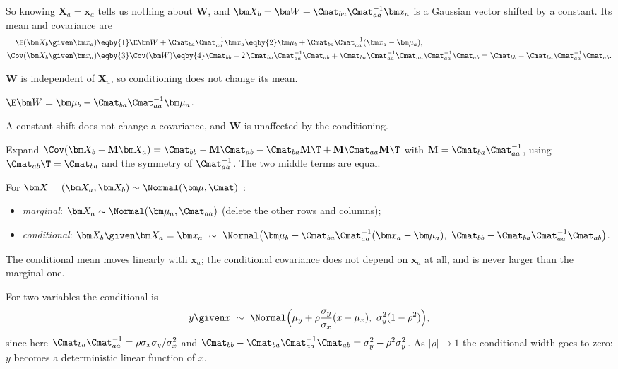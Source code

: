 So knowing $\bm X_a=\bm x_a$ tells us nothing about $\bm W$, and $\bm X_b=\bm W+\Cmat_{ba}\Cmat_{aa}^{-1}\bm x_a$ is a Gaussian vector shifted by a constant. Its mean and covariance are
\begin{align}
  \E(\bm X_b\given\bm x_a)
  &\eqby{1} \E\bm W+\Cmat_{ba}\Cmat_{aa}^{-1}\bm x_a
   \eqby{2} \bm\mu_b+\Cmat_{ba}\Cmat_{aa}^{-1}(\bm x_a-\bm\mu_a) ,\nonumber\\
  \Cov(\bm X_b\given\bm x_a)
  &\eqby{3} \Cov(\bm W)
   \eqby{4} \Cmat_{bb}-2\,\Cmat_{ba}\Cmat_{aa}^{-1}\Cmat_{ab}+\Cmat_{ba}\Cmat_{aa}^{-1}\Cmat_{aa}\Cmat_{aa}^{-1}\Cmat_{ab}
   = \Cmat_{bb}-\Cmat_{ba}\Cmat_{aa}^{-1}\Cmat_{ab} .
  \label{2b:eq:mvn-cond}
\end{align}
\begin{explain}
  \item $\bm W$ is independent of $\bm X_a$, so conditioning does not change its mean.
  \item $\E\bm W=\bm\mu_b-\Cmat_{ba}\Cmat_{aa}^{-1}\bm\mu_a$.
  \item A constant shift does not change a covariance, and $\bm W$ is unaffected by the conditioning.
  \item Expand $\Cov(\bm X_b-\mathbf M\bm X_a)=\Cmat_{bb}-\mathbf M\Cmat_{ab}-\Cmat_{ba}\mathbf M\T+\mathbf M\Cmat_{aa}\mathbf M\T$ with $\mathbf M=\Cmat_{ba}\Cmat_{aa}^{-1}$, using $\Cmat_{ab}\T=\Cmat_{ba}$ and the symmetry of $\Cmat_{aa}^{-1}$. The two middle terms are equal.
\end{explain}

\begin{keyidea}
For $\bm X=(\bm X_a,\bm X_b)\sim\Normal(\bm\mu,\Cmat)$ :
\begin{itemize}
  \item \emph{marginal}: $\bm X_a\sim\Normal(\bm\mu_a,\Cmat_{aa})$ (delete the other rows and columns);
  \item \emph{conditional}: $\bm X_b\given\bm X_a=\bm x_a\ \sim\ \Normal\bigl(\bm\mu_b+\Cmat_{ba}\Cmat_{aa}^{-1}(\bm x_a-\bm\mu_a),\ \Cmat_{bb}-\Cmat_{ba}\Cmat_{aa}^{-1}\Cmat_{ab}\bigr)$.
\end{itemize}
The conditional mean moves linearly with $\bm x_a$; the conditional covariance does not depend on $\bm x_a$ at all, and is never larger than the marginal one.
\end{keyidea}

For two variables the conditional is 
\begin{equation}
  y\given x\ \sim\ \Normal\Bigl(\mu_y+\rho\frac{\sigma_y}{\sigma_x}(x-\mu_x),\ \sigma_y^2(1-\rho^2)\Bigr),
  \label{2b:eq:bvn-cond}
\end{equation}
since here $\Cmat_{ba}\Cmat_{aa}^{-1}=\rho\sigma_x\sigma_y/\sigma_x^2$ and $\Cmat_{bb}-\Cmat_{ba}\Cmat_{aa}^{-1}\Cmat_{ab}=\sigma_y^2-\rho^2\sigma_y^2$. As $|\rho|\to1$ the conditional width goes to zero: $y$ becomes a deterministic linear function of $x$.

